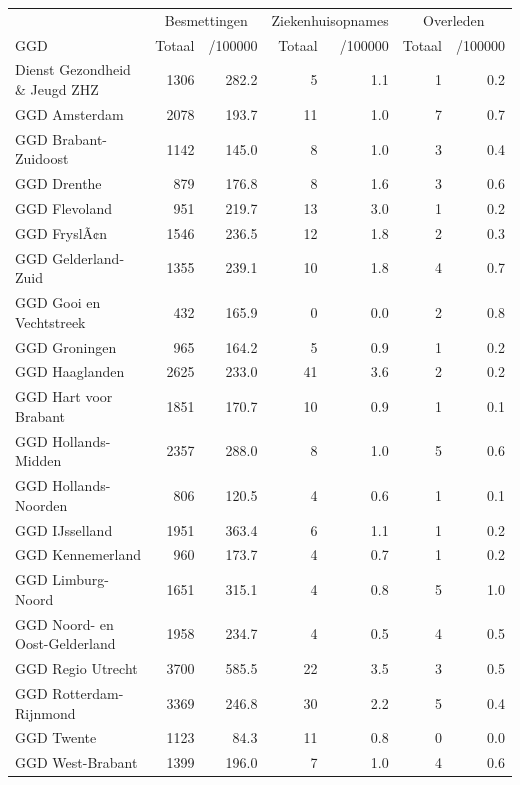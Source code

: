 \documentclass[
  english,
  man,floatsintext]{apa6}
\begin{document}
\begin{table}
\centering\begingroup\fontsize{10}{12}\selectfont

\begin{threeparttable}
\begin{tabular}{lrrrrrr}
\toprule
\multicolumn{1}{c}{ } & \multicolumn{2}{c}{Besmettingen} & \multicolumn{2}{c}{Ziekenhuisopnames} & \multicolumn{2}{c}{Overleden} \\
\cmidrule(l{3pt}r{3pt}){2-3} \cmidrule(l{3pt}r{3pt}){4-5} \cmidrule(l{3pt}r{3pt}){6-7}
GGD & Totaal & /100000 & Totaal & /100000 & Totaal & /100000\\
\midrule
Dienst Gezondheid \& Jeugd ZHZ & 1306 & 282.2 & 5 & 1.1 & 1 & 0.2\\
GGD Amsterdam & 2078 & 193.7 & 11 & 1.0 & 7 & 0.7\\
GGD Brabant-Zuidoost & 1142 & 145.0 & 8 & 1.0 & 3 & 0.4\\
GGD Drenthe & 879 & 176.8 & 8 & 1.6 & 3 & 0.6\\
GGD Flevoland & 951 & 219.7 & 13 & 3.0 & 1 & 0.2\\
GGD FryslÃ¢n & 1546 & 236.5 & 12 & 1.8 & 2 & 0.3\\
GGD Gelderland-Zuid & 1355 & 239.1 & 10 & 1.8 & 4 & 0.7\\
GGD Gooi en Vechtstreek & 432 & 165.9 & 0 & 0.0 & 2 & 0.8\\
GGD Groningen & 965 & 164.2 & 5 & 0.9 & 1 & 0.2\\
GGD Haaglanden & 2625 & 233.0 & 41 & 3.6 & 2 & 0.2\\
GGD Hart voor Brabant & 1851 & 170.7 & 10 & 0.9 & 1 & 0.1\\
GGD Hollands-Midden & 2357 & 288.0 & 8 & 1.0 & 5 & 0.6\\
GGD Hollands-Noorden & 806 & 120.5 & 4 & 0.6 & 1 & 0.1\\
GGD IJsselland & 1951 & 363.4 & 6 & 1.1 & 1 & 0.2\\
GGD Kennemerland & 960 & 173.7 & 4 & 0.7 & 1 & 0.2\\
GGD Limburg-Noord & 1651 & 315.1 & 4 & 0.8 & 5 & 1.0\\
GGD Noord- en Oost-Gelderland & 1958 & 234.7 & 4 & 0.5 & 4 & 0.5\\
GGD Regio Utrecht & 3700 & 585.5 & 22 & 3.5 & 3 & 0.5\\
GGD Rotterdam-Rijnmond & 3369 & 246.8 & 30 & 2.2 & 5 & 0.4\\
GGD Twente & 1123 & 84.3 & 11 & 0.8 & 0 & 0.0\\
GGD West-Brabant & 1399 & 196.0 & 7 & 1.0 & 4 & 0.6\\

\end{tabular}
\end{threeparttable}
\end{table}
\end{document}
